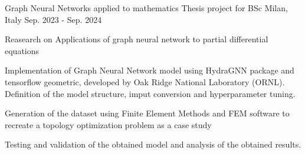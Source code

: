 


\begin{cventries}

  \cventry
    {Graph Neural Networks applied to mathematics} %
    {Thesis project for BSc} %
    {Milan, Italy} %
    {Sep. 2023 - Sep. 2024} %
    {
      \begin{cvitems} %
        \item {Reasearch on Applications of graph neural network to partial differential equations}
        \item {Implementation of Graph Neural Network model using HydraGNN package and tensorflow geometric, developed by Oak Ridge National Laboratory (ORNL). Definition of the model structure, imput conversion and hyperparameter tuning.}
        \item {Generation of the dataset using Finite Element Methods and FEM software to recreate a topology optimization problem as a case study}
        \item {Testing and validation of the obtained model and analysis of the obtained results.}
      \end{cvitems}
    }


\end{cventries}
